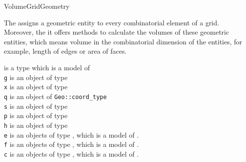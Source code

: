 \begin{Label}{VolumeGridGeometry}
\end{Label}

 The  assigns a geometric entity
to every combinatorial element of a grid. 
Moreover, the it offers methods to calculate the 
volumes of these geometric entities, 
which means volume in the combinatorial dimension of the 
entities, for example, length of edges or area of faces.


 is a type which is a model of  \\
{\tt g} is an object of type \\
{\tt x} is an object of type  \\
{\tt q} is an object of {\tt Geo::coord\_type}\\
{\tt s} is an object of type  \\
{\tt p} is an object of type \\
{\tt h} is an object of type \\
{\tt e} is an objects of type ,
 which is a model of .\\
{\tt f}  is an objects of type ,
which is a model of .\\
{\tt c}  is an objects of type ,
which is a model of .\\

\W{}

